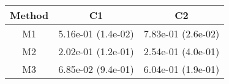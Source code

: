 \begin{tabular}{ccc}
\toprule
Method&C1&C2\tabularnewline
\midrule
M1& 5.16e-01 (1.4e-02)& 7.83e-01 (2.6e-02)\tabularnewline
M2& 2.02e-01 (1.2e-01)& 2.54e-01 (4.0e-01)\tabularnewline
M3& 6.85e-02 (9.4e-01)& 6.04e-01 (1.9e-01)\tabularnewline
\bottomrule
\end{tabular}
